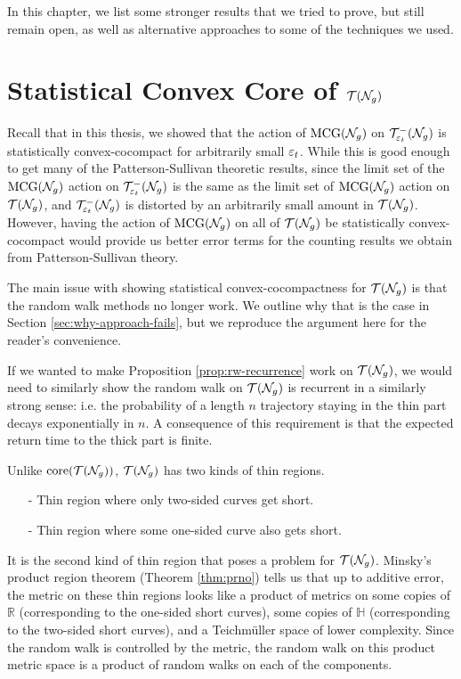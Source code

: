 In this chapter, we list some stronger results that we tried to prove, but still remain open, as well as alternative approaches to some of the techniques we used.

\section{Statistical Convex Core of $\mathcal{T}(\mathcal{N}_g)$}
\label{sec:stat-conv-core-of-full}

Recall that in this thesis, we showed that the action of $\mathrm{MCG}(\mathcal{N}_g)$ on $\mathcal{T}_{\varepsilon_t}^{-}(\mathcal{N}_g)$ is statistically convex-cocompact for arbitrarily small $\varepsilon_t$.
While this is good enough to get many of the Patterson-Sullivan theoretic results, since the limit set of the $\mathrm{MCG}(\mathcal{N}_g)$ action on $\mathcal{T}_{\varepsilon_t}^{-}(\mathcal{N}_g)$ is the same as the limit set of $\mathrm{MCG}(\mathcal{N}_g)$ action on $\mathcal{T}(\mathcal{N}_g)$, and $\mathcal{T}_{\varepsilon_t}^{-}(\mathcal{N}_g)$ is distorted by an arbitrarily small amount in $\mathcal{T}(\mathcal{N}_g)$.
However, having the action of $\mathrm{MCG}(\mathcal{N}_g)$ on all of $\mathcal{T}(\mathcal{N}_g)$ be statistically convex-cocompact would provide us better error terms for the counting results we obtain from Patterson-Sullivan theory.

The main issue with showing statistical convex-cocompactness for $\mathcal{T}(\mathcal{N}_g)$ is that the random walk methods no longer work.
We outline why that is the case in Section \ref{sec:why-approach-fails}, but we reproduce the argument here for the reader's convenience.

If we wanted to make Proposition \ref{prop:rw-recurrence} work on $\mathcal{T}(\mathcal{N}_g)$, we would need to similarly show the random walk on $\mathcal{T}(\mathcal{N}_g)$ is recurrent in a similarly strong sense: i.e. the probability of a length $n$ trajectory staying in the thin part decays exponentially in $n$.
A consequence of this requirement is that the expected return time to the thick part is finite.

Unlike $\mathrm{core}(\mathcal{T}(\mathcal{N}_g))$, $\mathcal{T}(\mathcal{N}_g)$ has two kinds of thin regions.
\begin{itemize}
\item[-] Thin region where only two-sided curves get short.
\item[-] Thin region where some one-sided curve also gets short.
\end{itemize}

It is the second kind of thin region that poses a problem for $\mathcal{T}(\mathcal{N}_g)$.
Minsky's product region theorem (Theorem \ref{thm:prno}) tells us that up to additive error, the metric on these thin regions looks like a product of metrics on some copies of $\mathbb{R}$ (corresponding to the one-sided short curves), some copies of $\mathbb{H}$ (corresponding to the two-sided short curves), and a Teichmüller space of lower complexity.
Since the random walk is controlled by the metric, the random walk on this product metric space is a product of random walks on each of the components.

